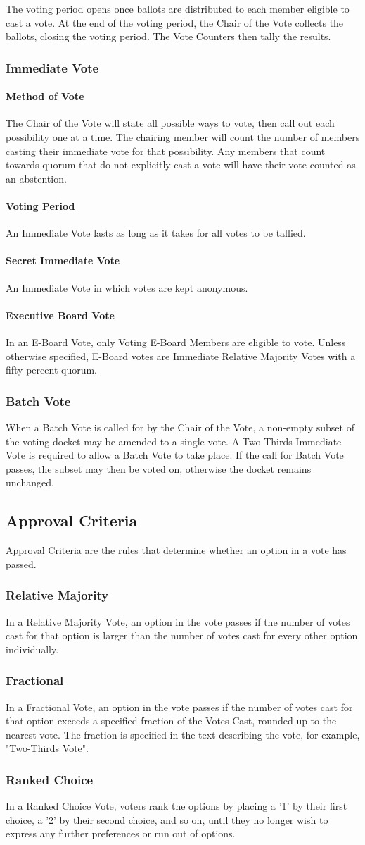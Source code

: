\documentclass{article}
\newcommand{\asection}[1]{\subsection{#1} \label{#1}}
\newcommand{\asubsection}[1]{\subsubsection{#1} \label{#1}}
\newcommand{\asubsubsection}[1]{\paragraph{#1} \label{#1}}
\begin{document}
The voting period opens once ballots are distributed to each member eligible to cast a vote.
At the end of the voting period, the Chair of the Vote collects the ballots, closing the voting period.
The Vote Counters then tally the results.

\asubsection{Immediate Vote}

\asubsubsection{Method of Vote}
The Chair of the Vote will state all possible ways to vote, then call out each possibility one at a time.
The chairing member will count the number of members casting their immediate vote for that possibility.
Any members that count towards quorum that do not explicitly cast a vote will have their vote counted as an abstention.

\asubsubsection{Voting Period}
An Immediate Vote lasts as long as it takes for all votes to be tallied.

\asubsubsection{Secret Immediate Vote}
An Immediate Vote in which votes are kept anonymous.

\asubsubsection{Executive Board Vote}
In an E-Board Vote, only Voting E-Board Members are eligible to vote.
Unless otherwise specified, E-Board votes are Immediate Relative Majority Votes with a fifty percent quorum.

\asubsection{Batch Vote}
When a Batch Vote is called for by the Chair of the Vote, a non-empty subset of the voting docket may be amended to a single vote.
A Two-Thirds Immediate Vote is required to allow a Batch Vote to take place.
If the call for Batch Vote passes, the subset may then be voted on, otherwise the docket remains unchanged.

\asection{Approval Criteria}
Approval Criteria are the rules that determine whether an option in a vote has passed.

\asubsection{Relative Majority}
In a Relative Majority Vote, an option in the vote passes if the number of votes cast for that option is larger than the number of votes cast for every other option individually.

\asubsection{Fractional}
In a Fractional Vote, an option in the vote passes if the number of votes cast for that option exceeds a specified fraction of the Votes Cast, rounded up to the nearest vote.
The fraction is specified in the text describing the vote, for example, "Two-Thirds Vote".

\asubsection{Ranked Choice}
In a Ranked Choice Vote, voters rank the options by placing a '1' by their first choice, a '2' by their second choice, and so on, until they no longer wish to express any further preferences or run out of options.
\end{document}
